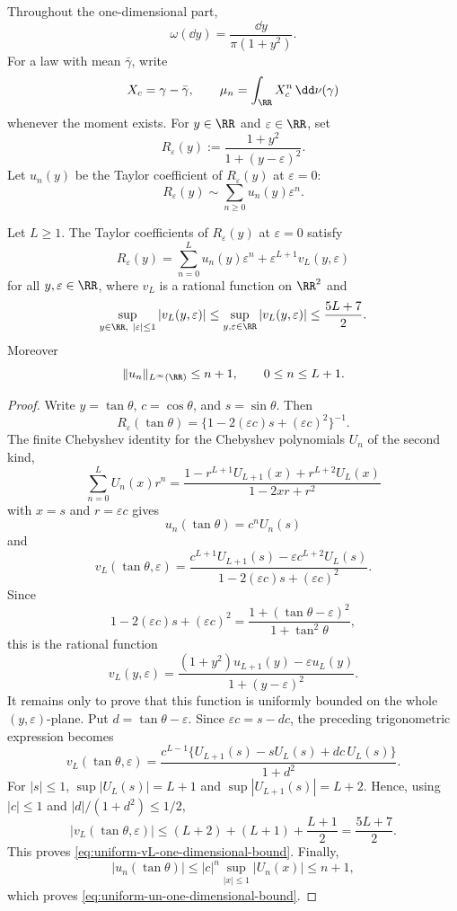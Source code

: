 Throughout the one-dimensional part,
\[
  \omega(\dd y)=\frac{\dd y}{\pi(1+y^2)}.
\]
For a law with mean \(\bar{\gamma}\), write
\[
  X_c=\gamma-\bar{\gamma},\qquad
  \mu_n=\int_{\RR} X_c^n\,\dd\nu(\gamma)
\]
whenever the moment exists.  For \(y\in\RR\) and \(\varepsilon\in\RR\), set
\[
R_\varepsilon(y):=\frac{1+y^2}{1+(y-\varepsilon)^2}.
\]
Let \(u_n(y)\) be the Taylor coefficient of \(R_\varepsilon(y)\) at
\(\varepsilon=0\):
\[
  R_\varepsilon(y)\sim\sum_{n\ge0}u_n(y)\varepsilon^n .
\]
\begin{lemma}%
\label{lem:uniform-one-dimensional-cayley-taylor-remainder}
Let \(L\ge1\).  The Taylor coefficients of \(R_\varepsilon(y)\) at
\(\varepsilon=0\) satisfy
\[
  R_\varepsilon(y)=\sum_{n=0}^{L}u_n(y)\varepsilon^n
  +\varepsilon^{L+1}v_L(y,\varepsilon)
\]
for all \(y,\varepsilon\in\RR\), where \(v_L\) is a rational function on
\(\RR^2\) and
\begin{equation}\label{eq:uniform-vL-one-dimensional-bound}
  \sup_{y\in\RR,\ |\varepsilon|\le1}|v_L(y,\varepsilon)|
  \le \sup_{y,\varepsilon\in\RR}|v_L(y,\varepsilon)|
  \le \frac{5L+7}{2}.
\end{equation}
Moreover
\begin{equation}\label{eq:uniform-un-one-dimensional-bound}
  \|u_n\|_{L^\infty(\RR)}\le n+1,\qquad 0\le n\le L+1 .
\end{equation}
\end{lemma}

\ifdefined\JFAArticleMain
{}
\else
\begin{proof}
Write \(y=\tan\theta\), \(c=\cos\theta\), and \(s=\sin\theta\).  Then
\[
R_\varepsilon(\tan\theta)
=\{1-2(\varepsilon c)s+(\varepsilon c)^2\}^{-1}.
\]
The finite Chebyshev identity for the Chebyshev polynomials \(U_n\) of the
second kind,
\[
\sum_{n=0}^{L}U_n(x)r^n
=\frac{1-r^{L+1}U_{L+1}(x)+r^{L+2}U_L(x)}
       {1-2xr+r^2}
\]
with \(x=s\) and \(r=\varepsilon c\) gives
\[
  u_n(\tan\theta)=c^nU_n(s)
\]
and
\[
v_L(\tan\theta,\varepsilon)
=\frac{c^{L+1}U_{L+1}(s)-\varepsilon c^{L+2}U_L(s)}
       {1-2(\varepsilon c)s+(\varepsilon c)^2}.
\]
Since
\[
1-2(\varepsilon c)s+(\varepsilon c)^2
=\frac{1+(\tan\theta-\varepsilon)^2}{1+\tan^2\theta},
\]
this is the rational function
\[
v_L(y,\varepsilon)
=\frac{(1+y^2)u_{L+1}(y)-\varepsilon u_L(y)}
       {1+(y-\varepsilon)^2}.
\]
It remains only to prove that this function is uniformly bounded on the whole
\((y,\varepsilon)\)-plane.  Put \(d=\tan\theta-\varepsilon\).  Since
\(\varepsilon c=s-dc\), the preceding trigonometric expression becomes
\[
v_L(\tan\theta,\varepsilon)
=\frac{c^{L-1}\{U_{L+1}(s)-sU_L(s)+dc\,U_L(s)\}}
       {1+d^2}.
\]
For \(|s|\le1\), \(\sup |U_L(s)|=L+1\) and
\(\sup |U_{L+1}(s)|=L+2\).  Hence, using
\(|c|\le1\) and \(|d|/(1+d^2)\le1/2\),
\[
|v_L(\tan\theta,\varepsilon)|
\le (L+2)+(L+1)+\frac{L+1}{2}
=\frac{5L+7}{2}.
\]
This proves \eqref{eq:uniform-vL-one-dimensional-bound}.  Finally,
\[
  |u_n(\tan\theta)|\le |c|^n\sup_{|x|\le1}|U_n(x)|\le n+1,
\]
which proves \eqref{eq:uniform-un-one-dimensional-bound}.
\end{proof}
\fi

